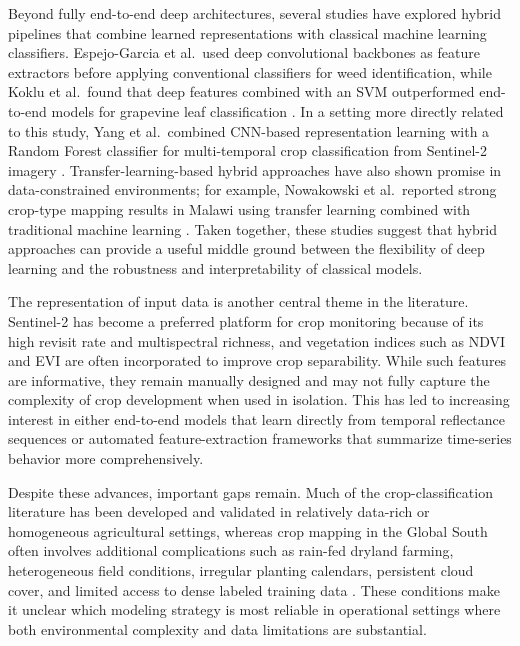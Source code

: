 \documentclass[pdflatex,sn-mathphys]{sn-jnl} %
\begin{document}
Beyond fully end-to-end deep architectures, several studies have explored hybrid pipelines that combine learned representations with classical machine learning classifiers. Espejo-Garcia et al.\ used deep convolutional backbones as feature extractors before applying conventional classifiers for weed identification, while Koklu et al.\ found that deep features combined with an SVM outperformed end-to-end models for grapevine leaf classification \cite{espejo2020, koklu2022}. In a setting more directly related to this study, Yang et al.\ combined CNN-based representation learning with a Random Forest classifier for multi-temporal crop classification from Sentinel-2 imagery \cite{yang2020}. Transfer-learning-based hybrid approaches have also shown promise in data-constrained environments; for example, Nowakowski et al.\ reported strong crop-type mapping results in Malawi using transfer learning combined with traditional machine learning \cite{nowakowski2021}. Taken together, these studies suggest that hybrid approaches can provide a useful middle ground between the flexibility of deep learning and the robustness and interpretability of classical models.

The representation of input data is another central theme in the literature. Sentinel-2 has become a preferred platform for crop monitoring because of its high revisit rate and multispectral richness, and vegetation indices such as NDVI and EVI are often incorporated to improve crop separability. While such features are informative, they remain manually designed and may not fully capture the complexity of crop development when used in isolation. This has led to increasing interest in either end-to-end models that learn directly from temporal reflectance sequences or automated feature-extraction frameworks that summarize time-series behavior more comprehensively.

Despite these advances, important gaps remain. Much of the crop-classification literature has been developed and validated in relatively data-rich or homogeneous agricultural settings, whereas crop mapping in the Global South often involves additional complications such as rain-fed dryland farming, heterogeneous field conditions, irregular planting calendars, persistent cloud cover, and limited access to dense labeled training data \cite{begue2020,mahlayeye2024}. These conditions make it unclear which modeling strategy is most reliable in operational settings where both environmental complexity and data limitations are substantial.
\end{document}
